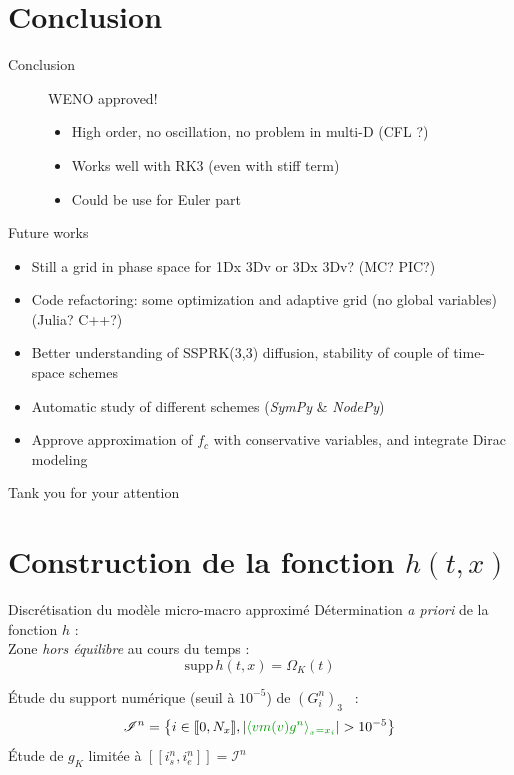 \documentclass{beamer}
\newcommand{\cmark}{{\color{dgreen}\ding{51}}}%
\newcommand{\backupbegin}{
   \newcounter{finalframe}
   \setcounter{finalframe}{\value{framenumber}}
}
\begin{document}
 \section{Conclusion}
 \begin{frame}{Conclusion}
 	\begin{description}
 		\item[\cmark{}] WENO approved! \begin{itemize}
 			\item High order, no oscillation, no problem in multi-D (CFL ?)
 			\item Works well with RK3 (even with stiff term)
 			\item Could be use for Euler part
 		\end{itemize}
 	\end{description}
 \end{frame}
 \begin{frame}{Future works}
 	\begin{itemize}
		\item Still a grid in phase space for 1Dx 3Dv or 3Dx 3Dv? (MC? PIC?)
		\item Code refactoring: some optimization and adaptive grid (no global variables) (Julia? C++?)
		\item Better understanding of SSPRK(3,3) diffusion, stability of couple of time-space schemes
		\item Automatic study of different schemes (\emph{SymPy} \& \emph{NodePy})
		\item Approve approximation of $f_c$ with conservative variables, and integrate Dirac modeling
 	\end{itemize}
 \end{frame}

 \begin{frame}[plain]
  \vfill
 	{Tank you for your attention}
  \vfill
 \end{frame}
\appendix



\backupbegin

  \section{Construction de la fonction $h(t,x)$}
  \begin{frame}{Discrétisation du modèle micro-macro approximé}
    Détermination \emph{a priori} de la fonction $h$ : \\

    Zone \emph{hors équilibre} au cours du temps :
    $$
      \textrm{supp}\, h(t,x) = \Omega_K(t)
    $$

    Étude du support numérique (seuil à $10^{-5}$) de $(G_{i}^n)_3$  :
    $$
      \mathscr{I}^n = \left\{ i\in [\![ 0 , N_x ]\!] , \left|{\color{dgreen} \langle vm(v)g^n \rangle_{_x=x_i} }\right| > 10^{-5} \right\}
    $$
    Étude de $g_K$ limitée à $[\![i_s^n,i_e^n]\!] = \mathscr{I}^n$
  \end{frame}
\end{document}
